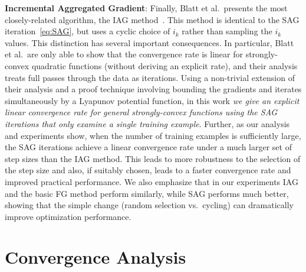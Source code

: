 \documentclass{article}
\begin{document}
\textbf{Incremental Aggregated Gradient}:
Finally, Blatt et al.~presents the most closely-related
algorithm, the IAG method~\cite{blatt2008convergent}.  This method is identical to the SAG
iteration~\eqref{eq:SAG}, but uses a cyclic choice of $i_k$ rather than
sampling the $i_k$ values.  This distinction has several important
consequences.  In particular, Blatt et al.~are only able to show that the
convergence rate is linear for strongly-convex quadratic functions (without
deriving an explicit rate), and their analysis treats full passes through
the data as iterations.  
Using a non-trivial extension of their analysis 
and a proof technique
involving bounding the gradients and iterates simultaneously by a Lyapunov potential function, in this work \emph{we give an explicit
linear convergence rate for general strongly-convex
functions using the SAG iterations that only examine a single training example}.  
Further, as our analysis and experiments show, when the number of training
examples is sufficiently large, the SAG iterations achieve a linear
convergence rate under a much larger set of step sizes than the IAG method. 
This leads to more robustness to the selection of the step size and also, if
suitably chosen, leads to a faster convergence rate and improved practical
performance.  We also emphasize that in our experiments IAG and the basic FG method perform similarly, while SAG performs much better, showing that the simple change (random selection vs.~cycling) can dramatically improve optimization performance.



\section{Convergence Analysis}
\label{convergence}

\end{document}
